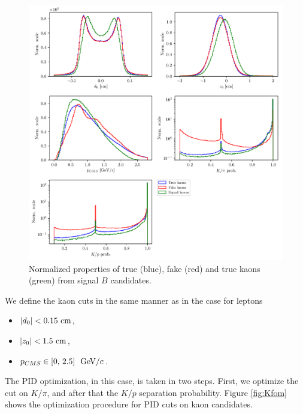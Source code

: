 \begin{figure}[H]
	\centering
	\includegraphics[width=\linewidth]{fig/FSP_kaon_vars}
	\captionsetup{width=.8\linewidth}
	\caption{Normalized properties of true (blue), fake (red) and true kaons (green) from signal $B$ candidates.}
	\label{fig:Kvars}
\end{figure}

We define the kaon cuts in the same manner as in the case for leptons
\begin{itemize}
	\item $\vert d_0 \vert < 0.15\mathrm{~cm}$,
	\item $\vert z_0 \vert < 1.5\mathrm{~cm}$,
	\item $p_{CMS} \in [0,\,2.5]~\mathrm{~GeV}/c$.
\end{itemize}

The PID optimization, in this case, is taken in two steps. First, we optimize the cut on $K / \pi$, and after that the $K/p$ separation probability. Figure \ref{fig:Kfom} shows the optimization procedure for PID cuts on kaon candidates.

